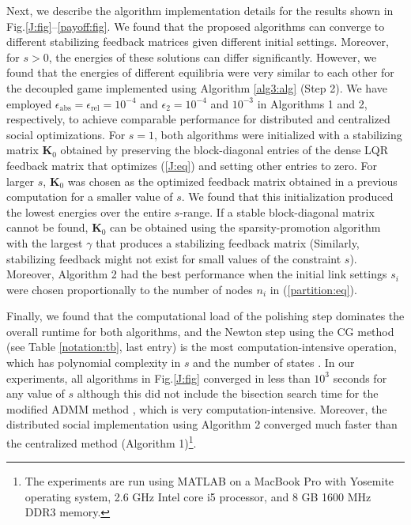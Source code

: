 \documentclass[12pt, draftclsnofoot,onecolumn]{IEEEtran}
\begin{document}
Next, we describe the algorithm implementation details for the results shown in Fig.\ref{J:fig}--\ref{payoff:fig}. We found that the proposed algorithms can converge to different stabilizing feedback matrices given different initial settings. Moreover, for $s>0$, the energies of these solutions can differ significantly. However, we found that the energies of different equilibria were very similar to each other for the decoupled game implemented using Algorithm \ref{alg3:alg} (Step 2). We have employed $\epsilon_{\mathrm{abs}}=\epsilon_{\mathrm{rel}}=10^{-4}$ and $\epsilon_2= 10^{-4}$ and $10^{-3}$ in Algorithms 1 and 2, respectively, to achieve comparable performance for distributed and centralized social optimizations. For $s=1$, both algorithms were initialized with a stabilizing matrix ${\boldsymbol K}_0$ obtained by preserving the block-diagonal entries of the dense LQR feedback matrix that optimizes (\ref{J:eq}) and setting other entries to zero. For larger $s$, $\boldsymbol{K}_0$ was chosen as the optimized feedback matrix obtained in a previous computation for a smaller value of $s$. We found that this initialization produced the lowest energies over the entire $s$-range. If a stable block-diagonal matrix cannot be found, ${\boldsymbol K}_0$ can be obtained using the sparsity-promotion algorithm \cite{dorjovchebulTPS14} with the largest $\gamma$ that produces a stabilizing feedback matrix (Similarly, stabilizing feedback might not exist for small values of the constraint $s$). Moreover, Algorithm 2 had the best performance when the initial link settings $s_i$ were chosen proportionally to the number of nodes $n_i$ in (\ref{partition:eq}).  


Finally, we found that the computational load of the polishing step dominates the overall runtime for both algorithms, and the Newton step using the CG method (see Table \ref{notation:tb}, last entry) is the most computation-intensive operation, which has polynomial complexity in $s$ and the number of states \cite{lin2013design}. In our experiments, all algorithms in Fig.\ref{J:fig} converged in less than $10^3$ seconds for any value of $s$ although this did not include the bisection search time for the modified ADMM method \cite{dorjovchebulTPS14}, which is very computation-intensive. Moreover, the distributed social implementation using Algorithm 2 converged much faster than the centralized method (Algorithm 1)\footnote{The experiments are run using MATLAB on a MacBook Pro with Yosemite operating system, 2.6 GHz Intel core i5 processor, and 8 GB 1600 MHz DDR3 memory.}. 
\end{document}
